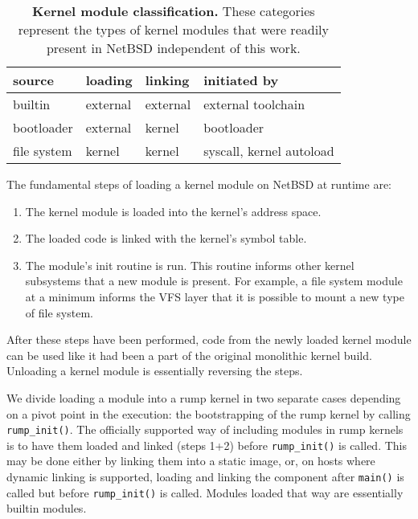 \begin{table}
\begin{tabular}{|l|l|l|l|}
\hline
source & loading & linking & initiated by \\
\hline
\hline
builtin & external & external & external toolchain \\
\hline
bootloader & external & kernel & bootloader \\
\hline
file system & kernel & kernel & syscall, kernel autoload \\
\hline
\end{tabular}
\caption[Kernel module classification]{
\textbf{Kernel module classification.}
These categories represent the types of kernel modules that were readily
present in NetBSD independent of this work.
}
\label{tab:kernmod}
\end{table}

The fundamental steps of loading a kernel module on NetBSD at
runtime are:

\begin{enumerate}
\item	The kernel module is loaded into the kernel's address space.

\item   The loaded code is linked with the kernel's symbol table.

\item   The module's init routine is run.  This routine informs other kernel
	subsystems that a new module is present.  For example, a
	file system module at a minimum informs the VFS layer that
	it is possible to mount a new type of file system.
\end{enumerate}

After these steps have been performed, code from the newly loaded
kernel module can be used like it had been a part of the original
monolithic kernel build.  Unloading a kernel module is essentially
reversing the steps.

We divide loading a module into a rump kernel in two separate cases
depending on a pivot point in the execution: the bootstrapping of the
rump kernel by calling \verb+rump_init()+.  The officially supported way
of including modules in rump kernels is to have them loaded and linked
(\ie steps 1+2) before \verb+rump_init()+ is called.  This may be done
either by linking them into a static image, or, on hosts where dynamic
linking is supported, loading and linking the component after \verb+main()+
is called but before \verb+rump_init()+ is called.  Modules loaded that
way are essentially builtin modules.

